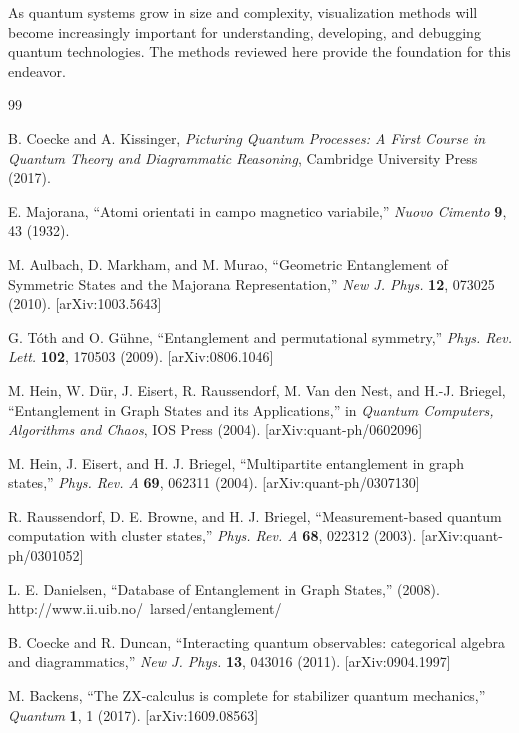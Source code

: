 \documentclass[12pt,a4paper]{article}
\begin{document}
As quantum systems grow in size and complexity, visualization methods will become increasingly important for understanding, developing, and debugging quantum technologies. The methods reviewed here provide the foundation for this endeavor.

\begin{thebibliography}{99}

	 B. Coecke and A. Kissinger, \textit{Picturing Quantum Processes: A First Course in Quantum Theory and Diagrammatic Reasoning}, Cambridge University Press (2017).

	 E. Majorana, ``Atomi orientati in campo magnetico variabile,'' \textit{Nuovo Cimento} \textbf{9}, 43 (1932).

	 M. Aulbach, D. Markham, and M. Murao, ``Geometric Entanglement of Symmetric States and the Majorana Representation,'' \textit{New J. Phys.} \textbf{12}, 073025 (2010). [arXiv:1003.5643]

	 G. Tóth and O. Gühne, ``Entanglement and permutational symmetry,'' \textit{Phys. Rev. Lett.} \textbf{102}, 170503 (2009). [arXiv:0806.1046]

	 M. Hein, W. Dür, J. Eisert, R. Raussendorf, M. Van den Nest, and H.-J. Briegel, ``Entanglement in Graph States and its Applications,'' in \textit{Quantum Computers, Algorithms and Chaos}, IOS Press (2004). [arXiv:quant-ph/0602096]

	 M. Hein, J. Eisert, and H. J. Briegel, ``Multipartite entanglement in graph states,'' \textit{Phys. Rev. A} \textbf{69}, 062311 (2004). [arXiv:quant-ph/0307130]

	 R. Raussendorf, D. E. Browne, and H. J. Briegel, ``Measurement-based quantum computation with cluster states,'' \textit{Phys. Rev. A} \textbf{68}, 022312 (2003). [arXiv:quant-ph/0301052]

	 L. E. Danielsen, ``Database of Entanglement in Graph States,'' (2008). http://www.ii.uib.no/~larsed/entanglement/

	 B. Coecke and R. Duncan, ``Interacting quantum observables: categorical algebra and diagrammatics,'' \textit{New J. Phys.} \textbf{13}, 043016 (2011). [arXiv:0904.1997]

	 M. Backens, ``The ZX-calculus is complete for stabilizer quantum mechanics,'' \textit{Quantum} \textbf{1}, 1 (2017). [arXiv:1609.08563]


\end{thebibliography}
\end{document}
